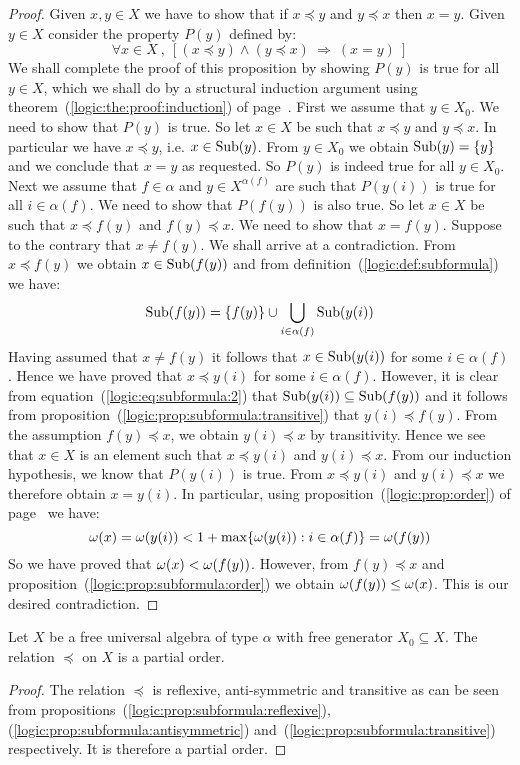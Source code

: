 \begin{proof}
Given $x,y\in X$ we have to show that if $x\preceq y$ and $y\preceq
x$ then $x=y$. Given $y\in X$ consider the property $P(y)$ defined
by:
    \[
    \forall x\in X\ ,\ [ (x\preceq y)\land(y\preceq x)\ \Rightarrow\
    (x=y)\ ]
    \]
We shall complete the proof of this proposition by showing $P(y)$ is
true for all $y\in X$, which we shall do by a structural induction
argument using theorem~(\ref{logic:the:proof:induction}) of
page~\pageref{logic:the:proof:induction}. First we assume that $y\in
X_{0}$. We need to show that $P(y)$ is true. So let $x\in X$ be such
that $x\preceq y$ and $y\preceq x$. In particular we have $x\preceq
y$, i.e. $x\in\mbox{\rm Sub}(y)$. From $y\in X_{0}$ we obtain
$\mbox{\rm Sub}(y)=\{y\}$ and we conclude that $x=y$ as requested. So $P(y)$
is indeed true for all $y\in X_{0}$. Next we assume that
$f\in\alpha$ and $y\in X^{\alpha(f)}$ are such that $P(y(i))$ is
true for all $i\in\alpha(f)$. We need to show that $P(f(y))$ is also
true. So let $x\in X$ be such that $x\preceq f(y)$ and $f(y)\preceq
x$. We need to show that $x=f(y)$. Suppose to the contrary that
$x\neq f(y)$. We shall arrive at a contradiction. From $x\preceq
f(y)$ we obtain $x\in\mbox{\rm Sub}(f(y))$ and from
definition~(\ref{logic:def:subformula}) we have:
    \begin{equation}\label{logic:eq:subformula:2}
    \mbox{\rm Sub}(f(y)) =
    \{f(y)\}\cup\bigcup_{i\in\alpha(f)}\mbox{\rm Sub}(y(i))
    \end{equation}
Having assumed that $x\neq f(y)$ it follows that $x\in\mbox{\rm Sub}(y(i))$
for some $i\in\alpha(f)$. Hence we have proved that $x\preceq y(i)$
for some $i\in\alpha(f)$. However, it is clear from
equation~(\ref{logic:eq:subformula:2}) that
$\mbox{\rm Sub}(y(i))\subseteq\mbox{\rm Sub}(f(y))$ and it follows from
proposition~(\ref{logic:prop:subformula:transitive}) that
$y(i)\preceq f(y)$. From the assumption $f(y)\preceq x$, we obtain
$y(i)\preceq x$ by transitivity. Hence we see that $x\in X$ is an
element such that $x\preceq y(i)$ and $y(i)\preceq x$. From our
induction hypothesis, we know that $P(y(i))$ is true. From $x\preceq
y(i)$ and $y(i)\preceq x$ we therefore obtain $x=y(i)$. In
particular, using proposition~(\ref{logic:prop:order}) of
page~\pageref{logic:prop:order} we have:
    \[
    \mbox{$\omega$}(x)=\mbox{$\omega$}(y(i))<1 +
    \max\{\mbox{$\omega$}(y(i)):i\in\alpha(f)\}=\mbox{$\omega$}(f(y))
    \]
So we have proved that $\mbox{$\omega$}(x)<\mbox{$\omega$}(f(y))$. However, from
$f(y)\preceq x$ and proposition~(\ref{logic:prop:subformula:order})
we obtain $\mbox{$\omega$}(f(y))\leq\mbox{$\omega$}(x)$. This is our desired contradiction.
\end{proof}
\begin{prop}\label{logic:prop:sunformula:partial:order}
Let $X$ be a free universal algebra of type $\alpha$ with free
generator $X_{0}\subseteq X$. The relation $\preceq$ on $X$ is a
partial order.
\end{prop}
\begin{proof}
The relation $\preceq$ is reflexive, anti-symmetric and transitive
as can be seen from
propositions~(\ref{logic:prop:subformula:reflexive}),
(\ref{logic:prop:subformula:antisymmetric})
and~(\ref{logic:prop:subformula:transitive}) respectively. It is
therefore a partial order.
\end{proof}
